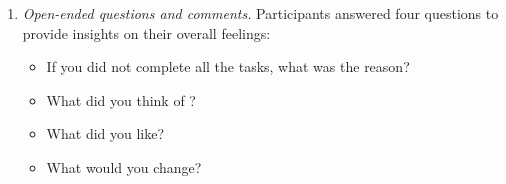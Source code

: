 \begin{enumerate}
    \item \textit{Open-ended questions and comments.} Participants answered four questions to provide insights on their overall feelings:
    \begin{itemize}[noitemsep]
        \item If you did not complete all the tasks, what was the reason?
        \item What did you think of \ql?
        \item What did you like?
        \item What would you change?
    \end{itemize}
\end{enumerate}



